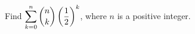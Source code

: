 Find $\displaystyle\sum_{k=0}^{n}\dbinom nk\left(\dfrac12\right)^k$, where $n$ is a positive integer.
